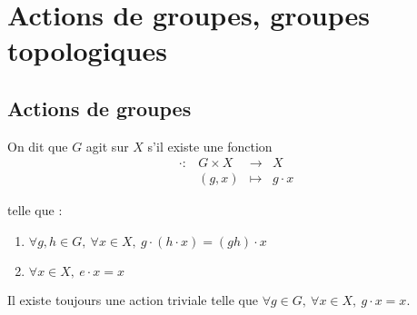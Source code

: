 \section{Actions de groupes, groupes topologiques}
\vspace{0.5em}

\subsection{Actions de groupes}
\vspace{0.5em}


\begin{defi}

 On dit que $G$ agit sur $X$ s'il existe une fonction
\begin{displaymath}
 \begin{array}{rrcl}
          \cdotp :& G\times X& \longrightarrow & X \\
           & (g,x)    & \longmapsto     & g\cdotp x
          \end{array}
\end{displaymath}

telle que :
\begin{enumerate}
 \item $\forall g,h \in G,\ \forall x \in X,\ g\cdotp(h\cdotp x) = (gh)\cdotp x$
 \item $\forall x \in X,\ e\cdotp x = x$
\end{enumerate}
\end{defi}

\begin{example}[Remarque]
 Il existe toujours une action triviale telle que $\forall g\in G,\ \forall x
\in X,\ g\cdotp x = x$.
\end{example}

